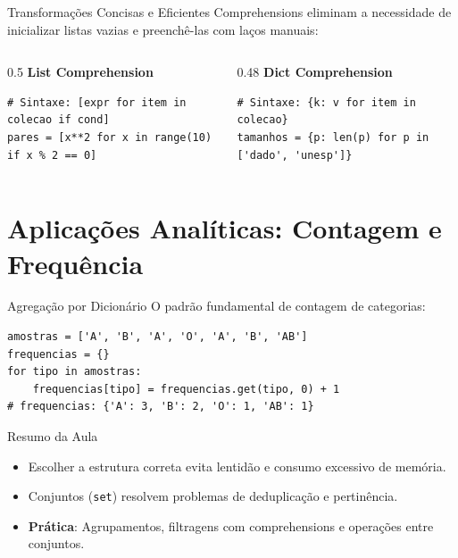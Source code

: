 \documentclass[aspectratio=169, 10pt]{beamer}
\begin{document}
\begin{frame}[fragile]{Transformações Concisas e Eficientes}
  Comprehensions eliminam a necessidade de inicializar listas vazias e preenchê-las com laços manuais:
  \begin{columns}
    \begin{column}{0.5\textwidth}
      \textbf{List Comprehension}
      \begin{lstlisting}
# Sintaxe: [expr for item in colecao if cond]
pares = [x**2 for x in range(10) if x % 2 == 0]
      \end{lstlisting}
    \end{column}
    \begin{column}{0.48\textwidth}
      \textbf{Dict Comprehension}
      \begin{lstlisting}
# Sintaxe: {k: v for item in colecao}
tamanhos = {p: len(p) for p in ['dado', 'unesp']}
      \end{lstlisting}
    \end{column}
  \end{columns}
\end{frame}

\section{Aplicações Analíticas: Contagem e Frequência}

\begin{frame}[fragile]{Agregação por Dicionário}
  O padrão fundamental de contagem de categorias:
  \begin{lstlisting}
amostras = ['A', 'B', 'A', 'O', 'A', 'B', 'AB']
frequencias = {}
for tipo in amostras:
    frequencias[tipo] = frequencias.get(tipo, 0) + 1
# frequencias: {'A': 3, 'B': 2, 'O': 1, 'AB': 1}
  \end{lstlisting}
\end{frame}

\begin{frame}{Resumo da Aula}
  \begin{itemize}
    \item Escolher a estrutura correta evita lentidão e consumo excessivo de memória.
    \item Conjuntos (\texttt{set}) resolvem problemas de deduplicação e pertinência.
    \item \textbf{Prática}: Agrupamentos, filtragens com comprehensions e operações entre conjuntos.
  \end{itemize}
\end{frame}
\end{document}
